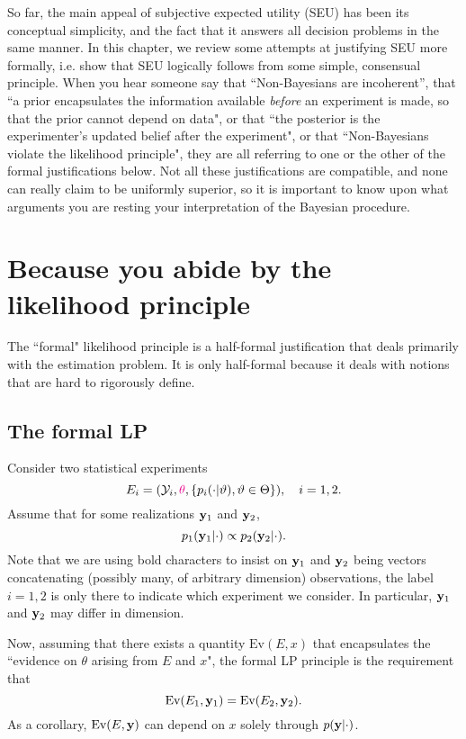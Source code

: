 So far, the main appeal of subjective expected utility (SEU) has been its conceptual simplicity, and the fact that it answers all decision problems in the same manner. 
In this chapter, we review some attempts at justifying SEU more formally, i.e. show that SEU logically follows from some simple, consensual principle.
When you hear someone say that ``Non-Bayesians are incoherent'', that ``a prior encapsulates the information available \emph{before} an experiment is made, so that the prior cannot depend on data", or that ``the posterior is the experimenter's updated belief after the experiment", or that ``Non-Bayesians violate the likelihood principle", they are all referring to one or the other of the formal justifications below. 
Not all these justifications are compatible, and none can really claim to be uniformly superior, so it is important to know upon what arguments you are resting your interpretation of the Bayesian procedure.

\section{Because you abide by the likelihood principle}
The ``formal" likelihood principle \citep{BeWo88} is a half-formal justification that deals primarily with the estimation problem. 
It is only half-formal because it deals with notions that are hard to rigorously define.

\subsection{The formal LP}
Consider two statistical experiments
$$
E_i=(\mathcal{Y}_i,\textcolor{magenta}{\theta}, \{p_i(\cdot\vert\vartheta), \vartheta\in\Theta\}), \quad i=1,2.
$$
Assume that for some realizations $\mathbf{y}_1$ and $\mathbf{y}_2$,
$$
p_1(\mathbf{y}_1\vert\cdot) \propto p_2(\mathbf{y}_2\vert \cdot).
$$
Note that we are using bold characters to insist on $\mathbf{y}_1$ and $\mathbf{y}_2$ being vectors concatenating (possibly many, of arbitrary dimension) observations, the label $i=1,2$ is only there to indicate which experiment we consider.
In particular, $\mathbf{y}_1$ and $\mathbf{y}_2$ may differ in dimension.

Now, assuming that there exists a quantity $\text{Ev}(E,x)$ that encapsulates the ``evidence on $\theta$ arising from $E$ and $x$", the formal LP principle is the requirement that
$$
\text{Ev}(E_1,\mathbf{y}_1) = \text{Ev}(E_2,\mathbf{y}_2).
$$
As a corollary, $\text{Ev}(E,\mathbf{y})$ can depend on $x$ solely through $p(\mathbf{y}\vert\cdot)$.

